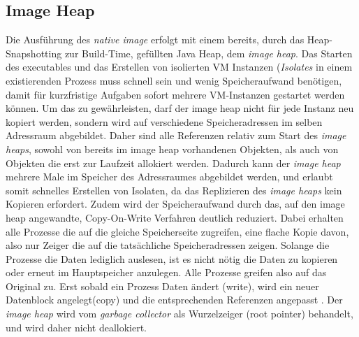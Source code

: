 \subsection{Image Heap}
\label{subsec:imageheap}

Die Ausführung des \textit{native image} erfolgt mit einem bereits, durch das Heap-Snapshotting zur Build-Time, gefüllten Java Heap,
dem \textit{image heap}. Das Starten des executables und das Erstellen von isolierten VM Instanzen (\textit{Isolates} in einem existierenden Prozess muss
schnell sein und wenig Speicheraufwand benötigen, damit für kurzfristige Aufgaben sofort mehrere VM-Instanzen gestartet werden können.
Um das zu gewährleisten, darf der image heap nicht für jede Instanz neu kopiert werden, sondern wird auf verschiedene Speicheradressen im selben Adressraum
abgebildet. Daher sind alle Referenzen relativ zum Start des \textit{image heaps}, sowohl von bereits im image heap vorhandenen Objekten, als auch von Objekten die 
erst zur Laufzeit allokiert werden. Dadurch kann der \textit{image heap} mehrere Male im Speicher des Adressraumes abgebildet werden, und erlaubt somit
schnelles Erstellen von Isolaten, da das Replizieren des \textit{image heaps} kein Kopieren erfordert. Zudem wird der Speicheraufwand durch das, auf den
image heap angewandte, Copy-On-Write Verfahren deutlich reduziert. Dabei erhalten alle Prozesse die auf die gleiche Speicherseite zugreifen, eine flache Kopie davon, also nur Zeiger die 
auf die tatsächliche Speicheradressen zeigen. Solange die Prozesse die Daten lediglich auslesen, ist es nicht nötig die Daten zu kopieren oder erneut im Hauptspeicher anzulegen. Alle Prozesse greifen also
auf das \grqq{}Original\grqq{} zu. Erst sobald ein Prozess Daten ändert (write), wird ein neuer Datenblock angelegt(copy) und die entsprechenden Referenzen angepasst \parencite{bovet2002understanding}.
Der \textit{image heap} wird vom \textit{garbage collector} als Wurzelzeiger (root pointer) behandelt, und wird daher nicht deallokiert.
